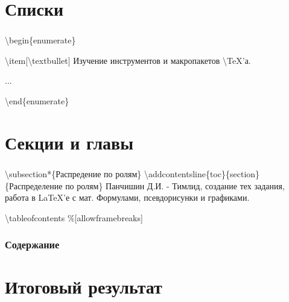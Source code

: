 \documentclass[russian, 14pt]{beamer}
\newcommand{\cm}[1]{{\color{Mycolor3}\textbackslash#1}}
\begin{document}
\section{Списки}

\begin{frame} \label{item2}
	\frametitle{\insertsection}
	\begin{block}{}
		\cm{begin}\{enumerate\}
		
		
			\cm{item}[\cm{textbullet}] Изучение инструментов и макропакетов \cm{TeX}’а.
			
			...
			
			
		\cm{end}\{enumerate\}
	\end{block}
	\hyperlink{item}{}
\end{frame}

\section{Секции и главы}

\begin{frame}
	\frametitle{\insertsection}
	\begin{block}{}
		\cm{subsection}*\{Распредение по ролям\}
		\cm{addcontentsline}\{toc\}\{section\}\{Распределение по ролям\}
		Панчишин Д.И. - Тимлид, создание тех задания, работа в LaTeX’е с мат. Формулами, псевдорисунки и графиками.
	\end{block}
	
\end{frame}

\begin{frame}[allowframebreaks]{}
	\begin{block}{}
		\cm{tableofcontents} \%[allowframebreaks]
	\end{block}
	\frametitle{Содержание}
	\tableofcontents
\end{frame}


\section{Итоговый результат}
\end{document}
